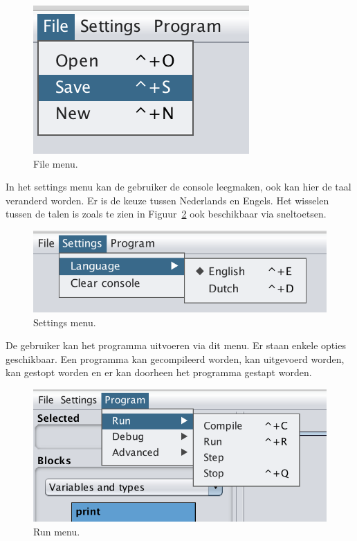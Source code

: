 \documentclass[]{article}
\begin{document}
\begin{figure}[H]
  \centering
\includegraphics[scale=0.65]{Documentatie/images/menu/filemenu}
  \caption{File menu.} 
  \label{filemenu}
\end{figure}
In het settings menu kan de gebruiker de console leegmaken, ook kan hier de taal veranderd worden. Er is de keuze tussen Nederlands en Engels. Het wisselen tussen de talen is zoals te zien in Figuur~\ref{settingsmenu} ook beschikbaar via sneltoetsen.
\begin{figure}[H]
  \centering
\includegraphics[scale=0.65]{Documentatie/images/menu/settingsmenu}
  \caption{Settings menu.} 
  \label{settingsmenu}
\end{figure}
De gebruiker kan het programma uitvoeren via dit menu. Er staan enkele opties geschikbaar. Een programma kan gecompileerd worden, kan uitgevoerd worden, kan gestopt worden en er kan doorheen het programma gestapt worden.
\begin{figure}[H]
  \centering
\includegraphics[scale=0.65]{Documentatie/images/menu/runmenu}
  \caption{Run menu.} 
  \label{runmenu}
\end{figure}
\end{document}
